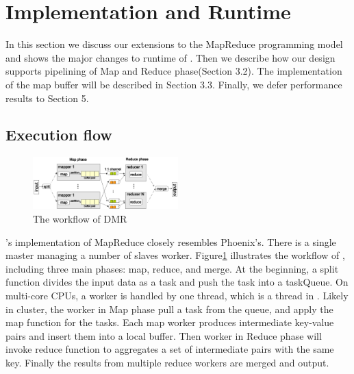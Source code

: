 \section{Implementation and Runtime}
In this section we discuss our extensions to the MapReduce programming model and shows the major changes to runtime of \myds. 
Then we describe how our design supports pipelining of Map and Reduce phase(Section 3.2).
The implementation of the map buffer will be described in Section 3.3.
Finally, we defer performance results to Section 5.



\subsection{Execution flow}
\begin{figure}[!h!t]  
    \centering
    \includegraphics[width=0.5\textwidth]{eps/dmr_workflow.eps}
    \caption{The workflow of DMR}
    \label{fig:dmr:workflow}
\end{figure}

\myds's implementation of MapReduce closely resembles Phoenix’s. 
There is a single master managing a number of slaves worker. 
Figure\ref{fig:dmr:workflow} illustrates the workflow of \myds,
including three main phases: map, reduce, and merge. 
At the beginning, a split function divides the input
data as a task and push the task into a taskQueue. 
On multi-core CPUs, a worker is handled by one thread, 
which is a \myth thread in \myds.
Likely in cluster, the worker in Map phase pull a task from the queue, 
and apply the map function for the tasks.
Each map worker produces intermediate key-value pairs and insert them into a local buffer.
Then worker in Reduce phase will invoke reduce function to aggregates a set of intermediate pairs with the same key.  
Finally the results from multiple reduce workers are merged and output.

